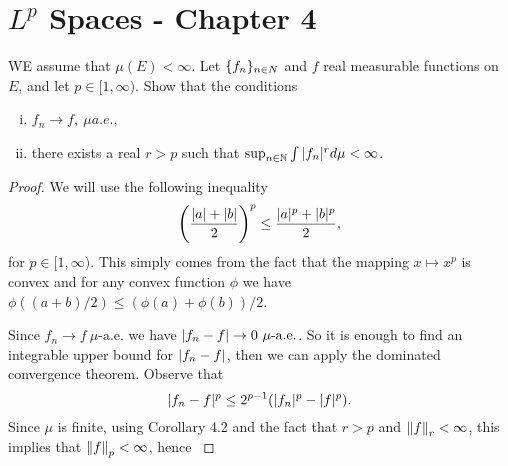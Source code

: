\section{$ L^p $ Spaces - Chapter 4}



\begin{problem}
	WE assume that $ \mu(E) < \infty $. Let $ \{f_n\}_{n\in N} $ and $ f $ real measurable functions on $ E $, and let $ p \in [1,\infty) $. Show that the conditions
	\begin{enumerate}[(i)]
		\item $ f_n \to f,\ \mu a.e. $,
		\item there exists a real $ r>p $ such that $ \sup_{n\in\mathbb{N}} \int |f_n|^r d\mu < \infty $.
	\end{enumerate}
\end{problem}
\begin{proof}
	We will use the following inequality
	\[ \left(\frac{|a| + |b|}{2}\right)^p \leq \frac{|a|^p + |b|^p}{2}, \]
	for $ p \in [1,\infty) $. This simply comes from the fact that the mapping $ x\mapsto x^p $ is convex and for any convex function $ \phi $ we have $ \phi((a+b)/2) \leq (\phi(a) + \phi(b))/2 $.
	
	Since $ f_n \to f \ \mu\text{-a.e.} $ we have $ \abs{f_n - f} \to 0 \ \mu\text{-a.e.} $. So it is enough to find an integrable upper bound for $ |f_n - f| $, then we can apply the dominated convergence theorem. Observe that
	\[ |f_n - f|^p \leq 2^{p-1}(|f_n|^p - |f|^p). \]
	Since $ \mu $ is finite, using Corollary 4.2 and the fact that $ r>p $ and $ \norm{f}_r < \infty$, this implies that $ \norm{f}_p <\infty $, hence $  $
\end{proof}



